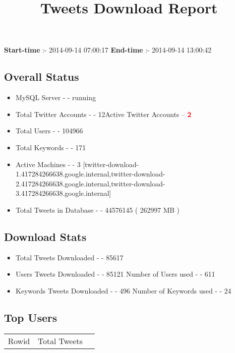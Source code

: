 \documentclass{article}\usepackage[T1]{fontenc}
\begin{document}
\title{\textbf{Tweets Download Report}}
               \date{}
                \maketitle
               \centerline{\textbf{Start-time} :- 2014-09-14 07:00:17 \hspace{40pt} \textbf{End-time} :- 2014-09-14 13:00:42}               \subsection*{Overall Status}                \begin{itemize}                \item MySQL Server - - running               \item Total Twitter Accounts - - 12\newline Active Twitter Accounts -- \textcolor{red}{\textbf{2}}               \item Total Users - - 104966               \item Total Keywords - - 171               \item Active Machines - - 3 [twitter-download-1.417284266638.google.internal,twitter-download-2.417284266638.google.internal,twitter-download-3.417284266638.google.internal]               \item Total Tweets in Database - - 44576145 ( 262997 MB )               \end{itemize}               \subsection*{Download Stats}                \begin{itemize}                \item Total Tweets Downloaded - - 85617               \item Users Tweets Downloaded - - 85121 \newline Number of Users used - - 611               \item Keywords Tweets Downloaded - - 496 \newline Number of Keywords used - - 24              \end{itemize}              \subsection*{Top Users}\begin{tabular}{|c|c|c|}         \hline         Rowid & Total Tweets \\ 

\end{tabular}
\end{document}
